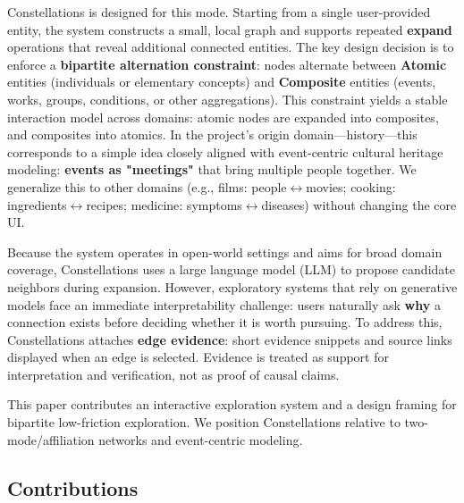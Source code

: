Constellations is designed for this mode. Starting from a single user-provided entity, the system constructs a small, local graph and supports repeated \textbf{expand} operations that reveal additional connected entities. The key design decision is to enforce a \textbf{bipartite alternation constraint}: nodes alternate between \textbf{Atomic} entities (individuals or elementary concepts) and \textbf{Composite} entities (events, works, groups, conditions, or other aggregations). This constraint yields a stable interaction model across domains: atomic nodes are expanded into composites, and composites into atomics. In the project's origin domain---history---this corresponds to a simple idea closely aligned with event-centric cultural heritage modeling: \textbf{events as "meetings"} that bring multiple people together. We generalize this to other domains (e.g., films: people\(\leftrightarrow\)movies; cooking: ingredients\(\leftrightarrow\)recipes; medicine: symptoms\(\leftrightarrow\)diseases) without changing the core UI.

Because the system operates in open-world settings and aims for broad domain coverage, Constellations uses a large language model (LLM) to propose candidate neighbors during expansion. However, exploratory systems that rely on generative models face an immediate interpretability challenge: users naturally ask \textbf{why} a connection exists before deciding whether it is worth pursuing. To address this, Constellations attaches \textbf{edge evidence}: short evidence snippets and source links displayed when an edge is selected. Evidence is treated as support for interpretation and verification, not as proof of causal claims.

This paper contributes an interactive exploration system and a design framing for bipartite low-friction exploration. We position Constellations relative to two-mode/affiliation networks and event-centric modeling.

\subsection{Contributions}

